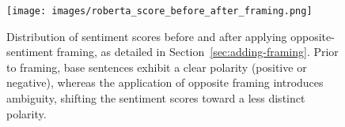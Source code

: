 \begin{figure}[tb!]
    \centering
    \texttt{[image: images/roberta\_score\_before\_after\_framing.png]}
    \caption{Distribution of sentiment scores before and after applying opposite-sentiment framing, as detailed in Section~\ref{sec:adding-framing}. Prior to framing, base sentences exhibit a clear polarity (positive or negative), whereas the application of opposite framing introduces ambiguity, shifting the sentiment scores toward a less distinct polarity.}
    \label{fig:pos-score-dist}
\end{figure}